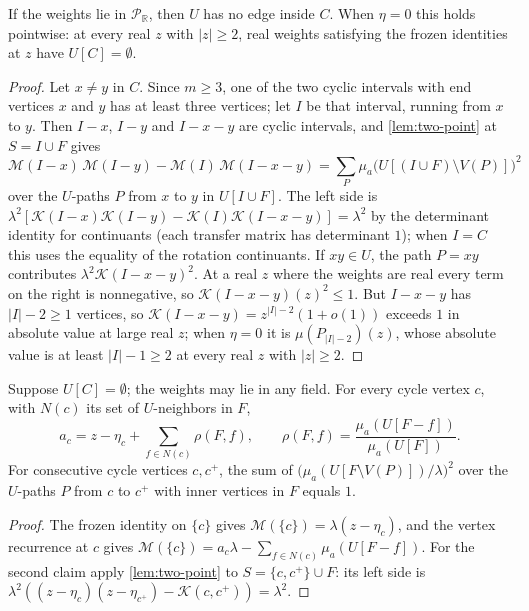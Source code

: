 \documentclass[final]{siamart0516}
\numberwithin{theorem}{section}
\numberwithin{equation}{section}
\theoremstyle{siamnonum}
\theoremstyle{plain}
\newcommand{\RR}{\mathbb{R}}
\newcommand{\Puis}{\mathcal{P}_{\RR}}
\newcommand{\Mpot}{\mathcal{M}}           %
\newcommand{\cont}{\mathcal{K}}           %
\begin{document}
\begin{lemma}\label{lem:frozen-path}
If the weights lie in $\Puis$, then $U$ has no edge inside $C$. When $\eta=0$ this holds pointwise: at every real $z$ with $|z|\ge2$, real weights satisfying the frozen identities at $z$ have $U[C]=\emptyset$.
\end{lemma}
\begin{proof}
Let $x\neq y$ in $C$. Since $m\ge3$, one of the two cyclic intervals with end vertices $x$ and $y$ has at least three vertices; let $I$ be that interval, running from $x$ to $y$. Then $I-x$, $I-y$ and $I-x-y$ are cyclic intervals, and \cref{lem:two-point} at $S=I\cup F$ gives
\[
\Mpot(I-x)\,\Mpot(I-y)-\Mpot(I)\,\Mpot(I-x-y)=\sum_{P}\mu_a\bigl(U[(I\cup F)\setminus V(P)]\bigr)^{2}
\]
over the $U$-paths $P$ from $x$ to $y$ in $U[I\cup F]$. The left side is $\lambda^{2}[\cont(I-x)\cont(I-y)-\cont(I)\cont(I-x-y)]=\lambda^{2}$ by the determinant identity for continuants (each transfer matrix has determinant $1$); when $I=C$ this uses the equality of the rotation continuants. If $xy\in U$, the path $P=xy$ contributes $\lambda^{2}\cont(I-x-y)^{2}$. At a real $z$ where the weights are real every term on the right is nonnegative, so $\cont(I-x-y)(z)^{2}\le1$. But $I-x-y$ has $|I|-2\ge1$ vertices, so $\cont(I-x-y)=z^{|I|-2}(1+o(1))$ exceeds $1$ in absolute value at large real $z$; when $\eta=0$ it is $\mu(P_{|I|-2})(z)$, whose absolute value is at least $|I|-1\ge2$ at every real $z$ with $|z|\ge2$.
\end{proof}

\begin{lemma}\label{lem:env-seen}
Suppose $U[C]=\emptyset$; the weights may lie in any field. For every cycle vertex $c$, with $N(c)$ its set of $U$-neighbors in $F$,
\[
a_c=z-\eta_c+\sum_{f\in N(c)}\rho(F,f),\qquad \rho(F,f)=\frac{\mu_a(U[F-f])}{\mu_a(U[F])}.
\]
For consecutive cycle vertices $c,c^{+}$, the sum of $\bigl(\mu_a(U[F\setminus V(P)])/\lambda\bigr)^{2}$ over the $U$-paths $P$ from $c$ to $c^{+}$ with inner vertices in $F$ equals $1$.
\end{lemma}
\begin{proof}
The frozen identity on $\{c\}$ gives $\Mpot(\{c\})=\lambda(z-\eta_c)$, and the vertex recurrence at $c$ gives $\Mpot(\{c\})=a_c\lambda-\sum_{f\in N(c)}\mu_a(U[F-f])$. For the second claim apply \cref{lem:two-point} to $S=\{c,c^{+}\}\cup F$: its left side is $\lambda^{2}((z-\eta_c)(z-\eta_{c^+})-\cont(c,c^{+}))=\lambda^{2}$.
\end{proof}
\end{document}
